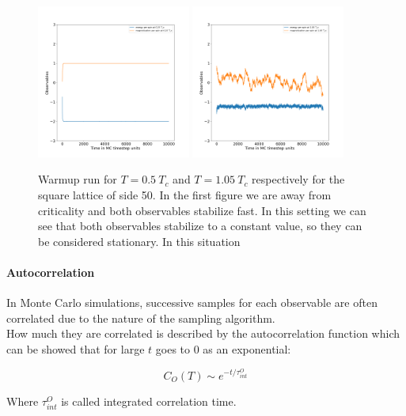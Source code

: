 \begin{figure}[H]
    \centering
    \includegraphics[width=0.45\textwidth]{FIG/exercise_5_images/warmup_observables_temp0.25T_c_dimension50.png} \hspace{0.5cm}
    \includegraphics[width=0.45\textwidth]{FIG/exercise_5_images/warmup_observables_temp1.05T_c_dimension50.png}
    \caption{Warmup run for $T=0.5\ T_c$ and $T=1.05\ T_c$ respectively for the square lattice of side 50.
    In the first figure we are away from criticality and both observables stabilize fast. In this setting we can see that 
    both observables stabilize to a constant value, so they can be considered stationary. In this situation }
    \label{lec5:thermalization}
\end{figure}

\paragraph{Autocorrelation} In Monte Carlo simulations, successive samples for each observable are often correlated due to the nature of the sampling algorithm. \\
How much they are correlated is described by the autocorrelation function which can be showed that for large $t$ goes to 0 as an exponential:

$$ C_O(T) \sim e^{-t/\tau^O_{int}} $$

Where $\tau^O_{int}$ is called integrated correlation time.
